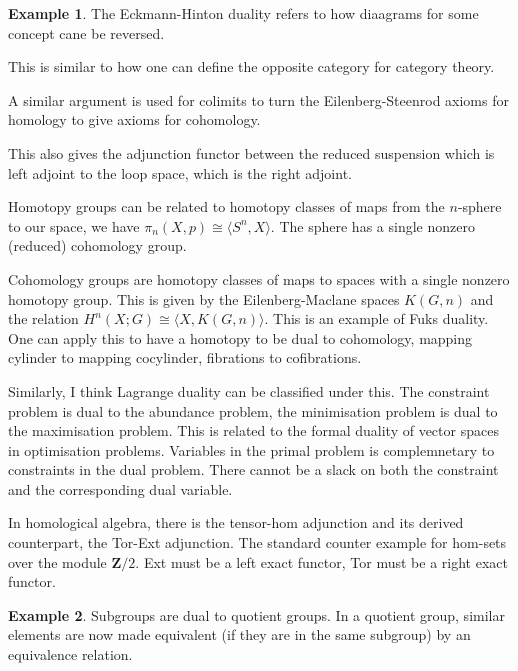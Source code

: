 \documentclass[10pt]{article}
\theoremstyle{plain}%
\theoremstyle{definition}
\newtheorem{example}{Example}[section]
\theoremstyle{remark}
\begin{document}
\begin{example}
	The Eckmann-Hinton duality refers to how diaagrams for some concept cane be reversed.

	This is similar to how one can define the opposite category for category theory.

	A similar argument is used for colimits to turn the Eilenberg-Steenrod axioms for homology to give axioms for cohomology.

	This also gives the adjunction functor between the reduced suspension which is left adjoint to the loop space, which is the right adjoint.

	Homotopy groups can be related to homotopy classes of maps from the $n$-sphere to our space, we have $\pi_n(X, p) \cong \langle S^n, X \rangle$. The sphere has a single nonzero (reduced) cohomology group.

	Cohomology groups are homotopy classes of maps to spaces with a single nonzero homotopy group. This is given by the Eilenberg-Maclane spaces $K(G, n)$ and the relation
	$H^n(X;G) \cong \langle X, K(G,n) \rangle$. This is an example of Fuks duality. One can apply this to have a homotopy to be dual to cohomology, mapping cylinder to mapping cocylinder, fibrations to cofibrations.

	Similarly, I think Lagrange duality can be classified under this. The constraint problem is dual to the abundance problem, the minimisation problem is dual to the maximisation problem. This is related to the formal duality of vector spaces in optimisation problems. Variables in the primal problem is complemnetary to constraints in the dual problem. There cannot be a slack on both the constraint and the corresponding dual variable.

	In homological algebra, there is the tensor-hom adjunction and its derived counterpart, the Tor-Ext adjunction. The standard counter example for hom-sets over the module $\mathbf{Z}/2$.
	Ext must be a left exact functor, Tor must be a right exact functor.
\end{example}

\begin{example}
	Subgroups are dual to quotient groups. In a quotient group, similar elements are now made equivalent (if they are in the same subgroup) by an equivalence relation.
\end{example}
\end{document}
